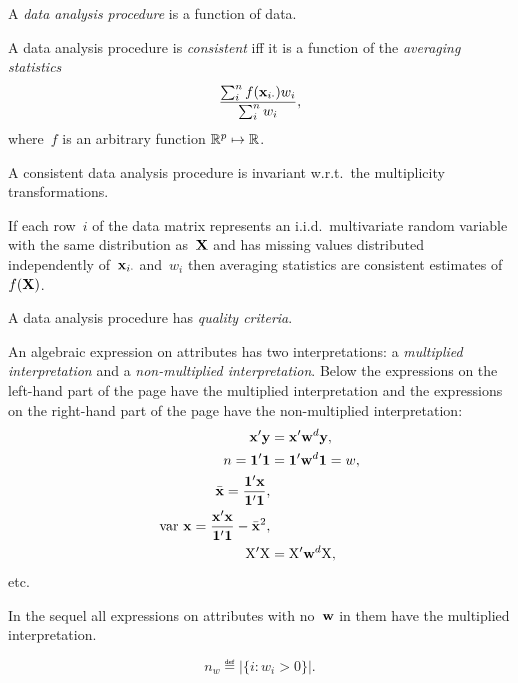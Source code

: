 \documentclass[10pt,a4paper]{article}
\theoremstyle{plain} \newtheorem{Lem}{Lemma}
\begin{document}
A {\em data analysis procedure} is a function of data.

A data analysis procedure is {\em consistent} iff it is a function of the {\em averaging statistics}
$$ \frac {\sum_i^n f(\mathbf x_{i\cdot}) w_i} {\sum_i^n w_i}, $$
where~$f$ is an arbitrary function $\mathbb R^p \mapsto \mathbb R$.

A consistent data analysis procedure is invariant w.r.t.~the multiplicity transformations.

If each row~$i$ of the data matrix represents an i.i.d.~multivariate random variable with the same distribution as~$\mathbf X$
and has missing values distributed independently of~$\mathbf x_{i\cdot}$ and~$w_i$
then averaging statistics are consistent estimates of~$f(\mathbf X)$.


A data analysis procedure has {\em quality criteria}.


An algebraic expression on attributes has two interpretations: a {\em multiplied interpretation} and a {\em non-multiplied interpretation}.
Below the expressions on the  left-hand part of the page have the multiplied interpretation 
and   the expressions on the right-hand part of the page have the non-multiplied interpretation:
\begin{align*}
\mathbf x' \mathbf y &= \mathbf x' \mathbf w^d \mathbf y, \\
n = \mathbf 1' \mathbf 1 &= \mathbf 1' \mathbf w^d \mathbf 1 = w, \\
\bar {\mathbf x} = \frac {\mathbf 1' \mathbf x} {\mathbf 1' \mathbf 1},& \\
\mathrm {var} \  \mathbf x = \frac {\mathbf x' \mathbf x} {\mathbf 1' \mathbf 1} - {\bar {\mathbf x}}^2,& \\
\mathrm X' \mathrm X &= \mathrm X' \mathbf w^d \mathrm X, 
\end{align*}
etc.

In the sequel all expressions on attributes with no~$\mathbf w$ in them have the multiplied interpretation.

$$ n_w \eqdef |\{i : w_i > 0\}|. $$



\end{document}
